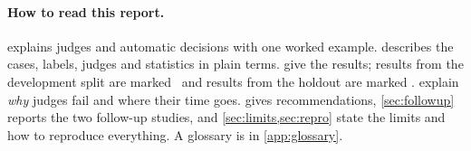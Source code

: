 \paragraph{How to read this report.}  explains judges and automatic decisions
with one worked example.  describes the cases, labels, judges and statistics in plain
terms.  give the results; results from the development split
are marked \screen\ and results from the holdout are marked \prereg. 
explain \emph{why} judges fail and where their time goes.  gives recommendations,
\cref{sec:followup} reports the two follow-up studies, and \cref{sec:limits,sec:repro} state the limits and how to reproduce everything. A glossary is in
\cref{app:glossary}.
